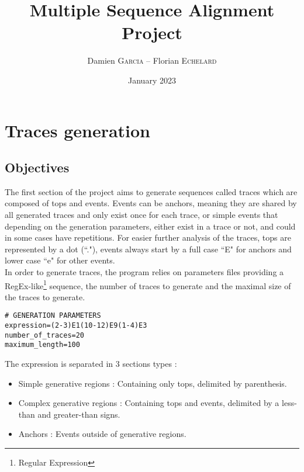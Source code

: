 \documentclass[12pt,a4paper]{article}
\begin{document}
	
\title{Multiple Sequence Alignment Project}
\author{Damien \textsc{Garcia} -- Florian \textsc{Echelard}}
\date{January 2023}

\begin{tcolorbox}
	\maketitle
\end{tcolorbox}

\tableofcontents
\listoffigures
\listoftables
	
\thispagestyle{empty}
\pagebreak


\section{Traces generation}

\subsection{Objectives}

The first section of the project aims to generate sequences called traces which are composed of tops and events. Events can be anchors, meaning they are shared by all generated traces and only exist once for each trace, or simple events that depending on the generation parameters, either exist in a trace or not, and could in some cases have repetitions. For easier further analysis of the traces, tops are represented by a dot (``."), events always start by a full case ``E" for anchors and lower case ``e" for other events.\\

In order to generate traces, the program relies on parameters files providing a RegEx-like\footnote{Regular Expression} sequence, the number of traces to generate and the maximal size of the traces to generate.

\begin{lstlisting}[caption={Parameters files example}]
# GENERATION PARAMETERS
expression=(2-3)E1(10-12)E9(1-4)E3
number_of_traces=20
maximum_length=100
\end{lstlisting}

The expression is separated in 3 sections types :
\begin{itemize}
	\item Simple generative regions : Containing only tops, delimited by parenthesis.
	\item Complex generative regions : Containing tops and events, delimited by a less-than and greater-than signs.
	\item Anchors : Events outside of generative regions.
\end{itemize}
\end{document}
